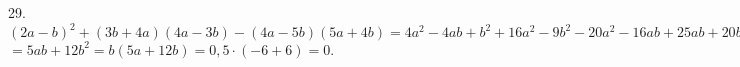 29. $(2a-b)^2+(3b+4a)(4a-3b)-(4a-5b)(5a+4b)=4a^2-4ab+b^2+16a^2-9b^2-20a^2-16ab+25ab+20b^2=$\\$=5ab+12b^2=b(5a+12b)=0,5\cdot(-6+6)=0.$\\
